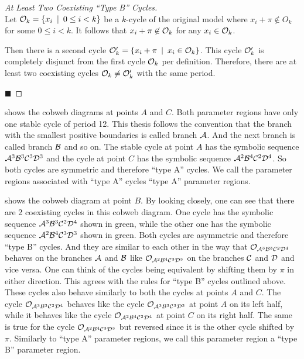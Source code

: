 \begin{proof}[At Least Two Coexisting ``Type B'' Cycles] \phantom{x} \\
	Let $\mathcal{O}_k = \left\{x_i \:\mid\: 0 \leq i < k\right\}$ be a $k$-cycle of the original model where $x_i + \pi \not\in O_k$ for some $0 \leq i < k$.
	It follows that $x_i + \pi \not\in \mathcal{O}_k$ for any $x_i \in \mathcal{O}_k$.

	Then there is a second cycle $\mathcal{O}'_k = \left\{x_i + \pi \:\mid\: x_i \in \mathcal{O}_k\right\}$.
	This cycle $\mathcal{O}'_k$ is completely disjunct from the first cycle $\mathcal{O}_k$ per definition.
	Therefore, there are at least two coexisting cycles $\mathcal{O}_k \neq \mathcal{O}'_k$ with the same period.

	\hfill	$\blacksquare$
\end{proof}

 shows the cobweb diagrams at points $A$ and $C$.
Both parameter regions have only one stable cycle of period 12.
This thesis follows the convention that the branch with the smallest positive boundaries is called branch $\mathcal{A}$.
And the next branch is called branch $\mathcal{B}$ and so on.
The stable cycle at point $A$ has the symbolic sequence $\mathcal{A}^3\mathcal{B}^3\mathcal{C}^3\mathcal{D}^3$ and the cycle at point $C$ has the symbolic sequence $\mathcal{A}^2\mathcal{B}^4\mathcal{C}^2\mathcal{D}^4$.
So both cycles are symmetric and therefore ``type A'' cycles.
We call the parameter regions associated with ``type A'' cycles ``type A'' parameter regions.

 shows the cobweb diagram at point $B$.
By looking closely, one can see that there are 2 coexisting cycles in this cobweb diagram.
One cycle has the symbolic sequence $\mathcal{A}^3\mathcal{B}^3\mathcal{C}^2\mathcal{D}^4$ shown in green, while the other one has the symbolic sequence $\mathcal{A}^2\mathcal{B}^4\mathcal{C}^3\mathcal{D}^3$ shown in green.
Both cycles are asymmetric and therefore ``type B'' cycles.
And they are similar to each other in the way that $\mathcal{O}_{\mathcal{A}^3\mathcal{B}^3\mathcal{C}^2\mathcal{D}^4}$ behaves on the branches $\mathcal{A}$ and $\mathcal{B}$ like $\mathcal{O}_{\mathcal{A}^2\mathcal{B}^4\mathcal{C}^3\mathcal{D}^3}$ on the branches $\mathcal{C}$ and $\mathcal{D}$ and vice versa.
One can think of the cycles being equivalent by shifting them by $\pi$ in either direction.
This agrees with the rules for ``type B'' cycles outlined above.
These cycles also behave similarly to both the cycles at points $A$ and $C$.
The cycle $\mathcal{O}_{\mathcal{A}^3\mathcal{B}^3\mathcal{C}^2\mathcal{D}^4}$ behaves like the cycle $\mathcal{O}_{\mathcal{A}^3\mathcal{B}^3\mathcal{C}^3\mathcal{D}^3}$ at point $A$ on its left half, while it behaves like the cycle $\mathcal{O}_{\mathcal{A}^2\mathcal{B}^4\mathcal{C}^2\mathcal{D}^4}$ at point $C$ on its right half.
The same is true for the cycle $\mathcal{O}_{\mathcal{A}^2\mathcal{B}^4\mathcal{C}^3\mathcal{D}^3}$ but reversed since it is the other cycle shifted by $\pi$.
Similarly to ``type A'' parameter regions, we call this parameter region a ``type B'' parameter region.


